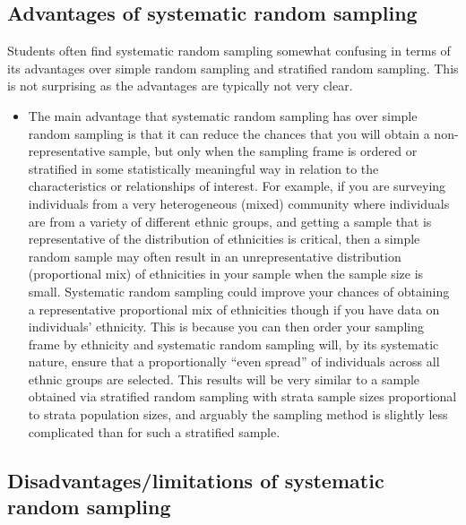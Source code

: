 \documentclass[
]{book}
\providecommand{\tightlist}{%
  \setlength{\itemsep}{0pt}\setlength{\parskip}{0pt}}
\begin{document}
\hypertarget{advantages-of-systematic-random-sampling}{%
\subsection{Advantages of systematic random sampling}\label{advantages-of-systematic-random-sampling}}

Students often find systematic random sampling somewhat confusing in terms of its advantages over simple random sampling and stratified random sampling. This is not surprising as the advantages are typically not very clear.

\begin{itemize}
\tightlist
\item
  The main advantage that systematic random sampling has over simple random sampling is that it can reduce the chances that you will obtain a non-representative sample, but only when the sampling frame is ordered or stratified in some statistically meaningful way in relation to the characteristics or relationships of interest. For example, if you are surveying individuals from a very heterogeneous (mixed) community where individuals are from a variety of different ethnic groups, and getting a sample that is representative of the distribution of ethnicities is critical, then a simple random sample may often result in an unrepresentative distribution (proportional mix) of ethnicities in your sample when the sample size is small. Systematic random sampling could improve your chances of obtaining a representative proportional mix of ethnicities though if you have data on individuals' ethnicity. This is because you can then order your sampling frame by ethnicity and systematic random sampling will, by its systematic nature, ensure that a proportionally ``even spread'' of individuals across all ethnic groups are selected. This results will be very similar to a sample obtained via stratified random sampling with strata sample sizes proportional to strata population sizes, and arguably the sampling method is slightly less complicated than for such a stratified sample.
\end{itemize}

\hypertarget{disadvantageslimitations-of-systematic-random-sampling}{%
\subsection{Disadvantages/limitations of systematic random sampling}\label{disadvantageslimitations-of-systematic-random-sampling}}
\end{document}
